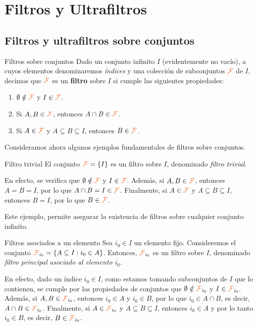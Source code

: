 \documentclass[titlepage,11pt,a4paper]{book}
\newcommand{\filt}{\ensuremath{\textcolor{Orange}{\mathcal{F}}}}
\begin{document}
\section*{Filtros y Ultrafiltros}

\subsection*{Filtros y ultrafiltros sobre conjuntos}

\begin{defn*}{Filtros sobre conjuntos}
Dado un conjunto infinito $I$ (evidentemente no vacío), a cuyos elementos denominaremos \textit{índices} y una colección de subconjuntos $\filt$ de $I$, decimos que $\filt$ es un \textbf{filtro} sobre $I$ si cumple las siguientes propiedades:
\begin{enumerate}
    \item[(i)] $\emptyset \notin \filt$ y $I \in \filt$.
    \item[(ii)] Si $A, B \in \filt$, entonces $A \cap B \in \filt$.
    \item[(iii)] Si $A \in \filt$ y $A \subseteq B \subseteq I$, entonces $B \in \filt$.
\end{enumerate}
\end{defn*}

Consideramos ahora algunos ejemplos fundamentales de filtros sobre conjuntos.

\begin{ejemplo*}{Filtro trivial}
El conjunto $\filt = \{I\}$ es un filtro sobre $I$, denominado \textit{filtro trivial}.

\medskip
En efecto, se verifica que $\emptyset \notin \filt$ y $I \in \filt$. Además, si $A, B \in \filt$, entonces $A = B = I$, por lo que $A \cap B = I \in \filt$. Finalmente, si $A \in \filt$ y $A \subseteq B \subseteq I$, entonces $B = I$, por lo que $B \in \filt$.

Este ejemplo, permite asegurar la existencia de filtros sobre cualquier conjunto infinito.
\end{ejemplo*}

\begin{ejemplo*}{Filtros asociados a un elemento}
Sea $i_{0} \in I$ un elemento fijo. Consideremos el conjunto $\filt_{i_{0}} = \{A \subseteq I : i_{0} \in A\}$. Entonces, $\filt_{i_{0}}$ es un filtro sobre $I$, denominado \textit{filtro principal asociado al elemento $i_{0}$}.
    
\medskip
En efecto, dado un índice $i_{0} \in I$, como estamos tomando subconjuntos de $I$ que lo contienen, se cumple por las propiedades de conjuntos que $\emptyset \notin \filt_{i_{0}}$ y $I \in \filt_{i_{0}}$. Además, si $A, B \in \filt_{i_{0}}$, entonces $i_{0} \in A$ y $i_{0} \in B$, por lo que $i_{0} \in A \cap B$, es decir, $A \cap B \in \filt_{i_{0}}$. Finalmente, si $A \in \filt_{i_{0}}$ y $A \subseteq B \subseteq I$, entonces $i_{0} \in A$ y por lo tanto $i_{0} \in B$, es decir, $B \in \filt_{i_{0}}$.

\end{ejemplo*}
\end{document}

